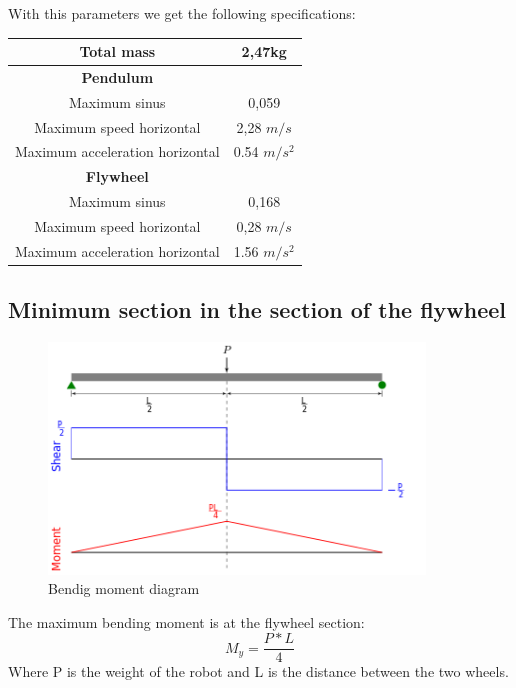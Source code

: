 With this parameters we get the following specifications:
\begin{center}
	\begin{tabular}{ |c|c| } 
	 \hline
	 Total mass & 2,47kg\\
	 \hline
	 \textbf{Pendulum} \\
	 \hline
	 Maximum sinus & 0,059\\
	 \hline
	 Maximum speed horizontal & 2,28 $m/s$\\
	 \hline
	 Maximum acceleration horizontal & 0.54 $m/s^2$\\
	 \hline
	 \textbf{Flywheel} \\
	 \hline
	 Maximum sinus & 0,168\\
	 \hline
	 Maximum speed horizontal & 0,28 $m/s$\\
	 \hline
	 Maximum acceleration horizontal & 1.56 $m/s^2$\\
	 \hline

	\end{tabular}
\end{center}


\subsection{Minimum section in the section of the flywheel}
\begin{figure}[ht]
	\centering
	\includegraphics[width=10cm]{img/Shear_Moment_Diagram.png}
	\caption{Bendig moment diagram}
	\label{fig:Bendig moment diagram}
\end{figure}
The maximum bending moment is at the flywheel section:
\[M_y = \frac{P * L}{4}\]
Where P is the weight of the robot and L is the distance between the two wheels.



